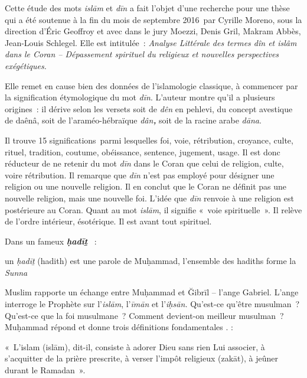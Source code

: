 Cette étude des mots \emph{islām} et \emph{dīn} a fait l'objet d'une
recherche pour une thèse qui a été soutenue à la fin du mois de
septembre 2016~par Cyrille Moreno, sous la direction d'Éric Geoffroy et
avec dans le jury Moezzi, Denis Gril, Makram Abbès, Jean-Louis Schlegel.
Elle est intitulée~: \emph{Analyse Littérale des termes dîn et islâm
dans le Coran -- Dépassement spirituel du religieux et nouvelles
perspectives exégétiques.}

Elle remet en cause bien des données de l'islamologie classique, à
commencer par la signification étymologique du mot \emph{dīn}. L'auteur
montre qu'il a plusieurs origines~: il dérive selon les versets soit de
\emph{dên} en pehlevi, du concept avestique de daênâ, soit de
l'araméo-hébraïque \emph{dân\textbf{,}} soit de la racine arabe
\emph{dāna}.

Il trouve 15 significations~parmi lesquelles foi, voie, rétribution,
croyance, culte, rituel, tradition, coutume, obéissance, sentence,
jugement, usage. Il est donc réducteur de ne retenir du mot \emph{dīn}
dans le Coran que celui de religion, culte, voire rétribution. Il
remarque que \emph{dīn} n'est pas employé pour désigner une religion ou
une nouvelle religion. Il en conclut que le Coran ne définit pas une
nouvelle religion, mais une nouvelle foi. L'idée que \emph{dīn} renvoie
à une religion est postérieure au Coran. Quant au mot \emph{islām}, il
signifie «~voie spirituelle~». Il relève de l'ordre intérieur,
ésotérique. Il est avant tout spirituel.


Dans un fameux \emph{\textbf{ḥadīṯ}} ~:

\begin{Def}[ḥadīṯ]

un \emph{ḥadīṯ} (hadith) est une parole
de Muḥammad, l'ensemble des hadiths forme la \emph{Sunna}

\end{Def}

Muslim rapporte un échange entre Muḥammad et Ğibrīl -- l'ange Gabriel.
L'ange interroge le Prophète sur l'\emph{islām}, l'\emph{īmān} et
l'\emph{iḥsān.} Qu'est-ce qu'être musulman~? Qu'est-ce que la foi
musulmane~? Comment devient-on meilleur musulman~? Muḥammad répond et
donne trois définitions fondamentales . :
\begin{Def}[islām]
«~L'islam (islām), dit-il, consiste à adorer Dieu sans rien Lui
associer, à s'acquitter de la prière prescrite, à verser l'impôt
religieux (zakāt), à jeûner durant le Ramadan~».
\end{Def}

